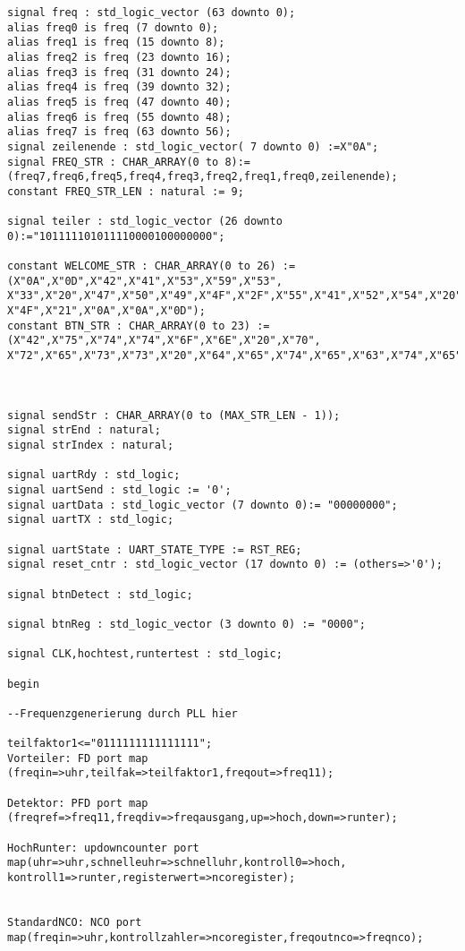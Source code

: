 \documentclass{article}
\begin{document}
\begin{verbatim}
signal freq : std_logic_vector (63 downto 0);
alias freq0 is freq (7 downto 0);
alias freq1 is freq (15 downto 8);
alias freq2 is freq (23 downto 16);
alias freq3 is freq (31 downto 24);
alias freq4 is freq (39 downto 32);
alias freq5 is freq (47 downto 40);
alias freq6 is freq (55 downto 48);
alias freq7 is freq (63 downto 56);
signal zeilenende : std_logic_vector( 7 downto 0) :=X"0A";
signal FREQ_STR : CHAR_ARRAY(0 to 8):=(freq7,freq6,freq5,freq4,freq3,freq2,freq1,freq0,zeilenende);
constant FREQ_STR_LEN : natural := 9;

signal teiler : std_logic_vector (26 downto 0):="101111101011110000100000000";

constant WELCOME_STR : CHAR_ARRAY(0 to 26) := (X"0A",X"0D",X"42",X"41",X"53",X"59",X"53",
X"33",X"20",X"47",X"50",X"49",X"4F",X"2F",X"55",X"41",X"52",X"54",X"20",X"44",X"45",X"4D",
X"4F",X"21",X"0A",X"0A",X"0D");
constant BTN_STR : CHAR_ARRAY(0 to 23) := (X"42",X"75",X"74",X"74",X"6F",X"6E",X"20",X"70",
X"72",X"65",X"73",X"73",X"20",X"64",X"65",X"74",X"65",X"63",X"74",X"65",X"64",X"21",X"0A",X"0D");



signal sendStr : CHAR_ARRAY(0 to (MAX_STR_LEN - 1));
signal strEnd : natural;
signal strIndex : natural;

signal uartRdy : std_logic;
signal uartSend : std_logic := '0';
signal uartData : std_logic_vector (7 downto 0):= "00000000";
signal uartTX : std_logic;

signal uartState : UART_STATE_TYPE := RST_REG;
signal reset_cntr : std_logic_vector (17 downto 0) := (others=>'0');

signal btnDetect : std_logic;

signal btnReg : std_logic_vector (3 downto 0) := "0000";

signal CLK,hochtest,runtertest : std_logic;

begin

--Frequenzgenerierung durch PLL hier

teilfaktor1<="0111111111111111";
Vorteiler: FD port map (freqin=>uhr,teilfak=>teilfaktor1,freqout=>freq11);

Detektor: PFD port map (freqref=>freq11,freqdiv=>freqausgang,up=>hoch,down=>runter);

HochRunter: updowncounter port map(uhr=>uhr,schnelleuhr=>schnelluhr,kontroll0=>hoch,
kontroll1=>runter,registerwert=>ncoregister);


StandardNCO: NCO port map(freqin=>uhr,kontrollzahler=>ncoregister,freqoutnco=>freqnco);


\end{verbatim}
\end{document}
